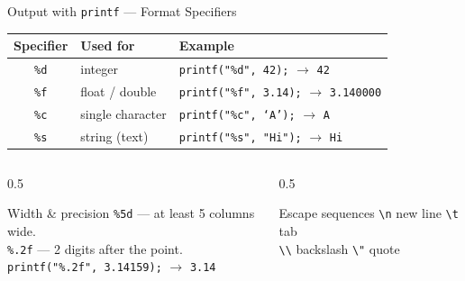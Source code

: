 \documentclass[aspectratio=169]{beamer}
\begin{document}
	\begin{frame}[fragile]{Output with \texttt{printf} --- Format Specifiers}
		\renewcommand{\arraystretch}{1.3}
		\centering
		\begin{tabular}{@{}cll@{}}
			\toprule
			\textbf{Specifier} & \textbf{Used for} & \textbf{Example} \\
			\midrule
			\texttt{\%d} & integer               & \texttt{printf("\%d", 42);} $\rightarrow$ \texttt{42} \\
			\texttt{\%f} & float / double        & \texttt{printf("\%f", 3.14);} $\rightarrow$ \texttt{3.140000} \\
			\texttt{\%c} & single character      & \texttt{printf("\%c", `A');} $\rightarrow$ \texttt{A} \\
			\texttt{\%s} & string (text)         & \texttt{printf("\%s", "Hi");} $\rightarrow$ \texttt{Hi} \\
			\bottomrule
		\end{tabular}
		\vspace{0.3cm}
		\begin{columns}[T]
			\begin{column}{0.5\textwidth}
				\begin{block}{Width \& precision}
					\small
					\texttt{\%5d} --- at least 5 columns wide.\\
					\texttt{\%.2f} --- 2 digits after the point.\\
					\texttt{printf("\%.2f", 3.14159);} $\rightarrow$ \texttt{3.14}
				\end{block}
			\end{column}
			\begin{column}{0.5\textwidth}
				\begin{block}{Escape sequences}
					\small
					\texttt{\textbackslash n} new line \quad \texttt{\textbackslash t} tab \\
					\texttt{\textbackslash\textbackslash} backslash \quad \texttt{\textbackslash"} quote
				\end{block}
			\end{column}
		\end{columns}
	\end{frame}
	
\end{document}
